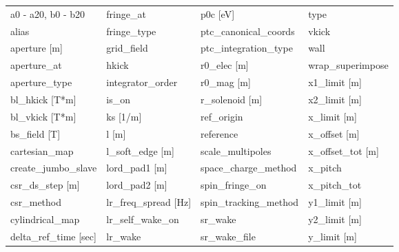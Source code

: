  \begin{tabular}{llll} \toprule
a0 - a20, b0 - b20               & fringe_at                        & p0c [eV]                         & type                             \\
alias                            & fringe_type                      & ptc_canonical_coords             & vkick                            \\
aperture [m]                     & grid_field                       & ptc_integration_type             & wall                             \\
aperture_at                      & hkick                            & r0_elec [m]                      & wrap_superimpose                 \\
aperture_type                    & integrator_order                 & r0_mag [m]                       & x1_limit [m]                     \\
bl_hkick [T*m]                   & is_on                            & r_solenoid [m]                   & x2_limit [m]                     \\
bl_vkick [T*m]                   & ks [1/m]                         & ref_origin                       & x_limit [m]                      \\
bs_field [T]                     & l [m]                            & reference                        & x_offset [m]                     \\
cartesian_map                    & l_soft_edge [m]                  & scale_multipoles                 & x_offset_tot [m]                 \\
create_jumbo_slave               & lord_pad1 [m]                    & space_charge_method              & x_pitch                          \\
csr_ds_step [m]                  & lord_pad2 [m]                    & spin_fringe_on                   & x_pitch_tot                      \\
csr_method                       & lr_freq_spread [Hz]              & spin_tracking_method             & y1_limit [m]                     \\
cylindrical_map                  & lr_self_wake_on                  & sr_wake                          & y2_limit [m]                     \\
delta_ref_time [sec]             & lr_wake                          & sr_wake_file                     & y_limit [m]                      \\

\end{tabular}
